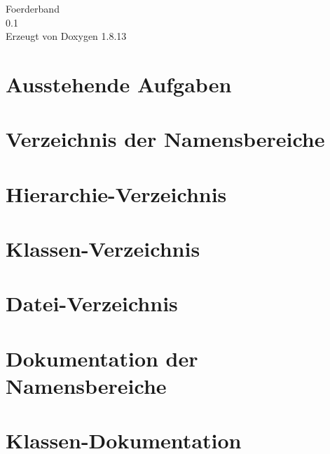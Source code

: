 \documentclass[twoside]{book}
\newcommand{\+}{\discretionary{\mbox{\scriptsize$\hookleftarrow$}}{}{}}
\newcommand{\clearemptydoublepage}{%
  \newpage{\pagestyle{empty}\cleardoublepage}%
}
\begin{document}
\hypersetup{pageanchor=false,
             bookmarksnumbered=true,
             pdfencoding=unicode
            }
\begin{titlepage}
\vspace*{7cm}
\begin{center}%
{\Large Foerderband \\[1ex]\large 0.\+1 }\\
\vspace*{1cm}
{\large Erzeugt von Doxygen 1.8.13}\\
\end{center}
\end{titlepage}
\clearemptydoublepage
{}
\tableofcontents
\clearemptydoublepage
{}
\hypersetup{pageanchor=true}

\chapter{Ausstehende Aufgaben}
\label{todo}
\hypertarget{todo}{}

\chapter{Verzeichnis der Namensbereiche}

\chapter{Hierarchie-\/\+Verzeichnis}

\chapter{Klassen-\/\+Verzeichnis}

\chapter{Datei-\/\+Verzeichnis}

\chapter{Dokumentation der Namensbereiche}

\chapter{Klassen-\/\+Dokumentation}





























\end{document}
